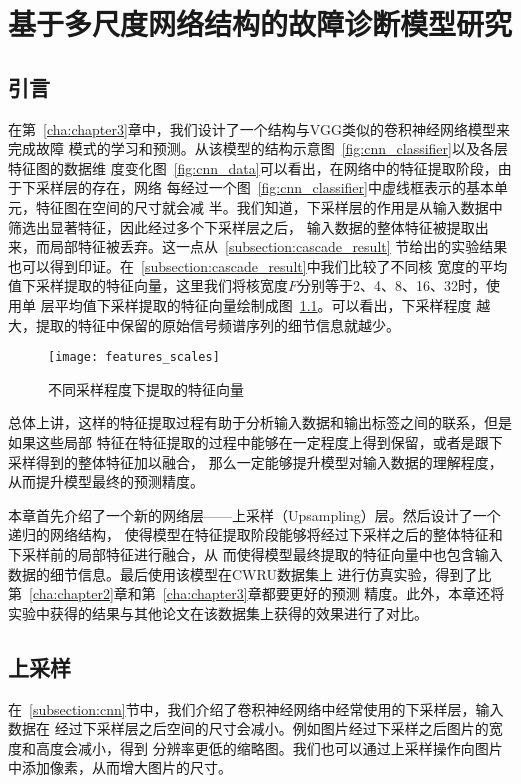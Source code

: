 \chapter{基于多尺度网络结构的故障诊断模型研究}

\section{引言}

在第~\ref{cha:chapter3}章中，我们设计了一个结构与VGG类似的卷积神经网络模型来完成故障
模式的学习和预测。从该模型的结构示意图~\ref{fig:cnn_classifier}以及各层特征图的数据维
度变化图~\ref{fig:cnn_data}可以看出，在网络中的特征提取阶段，由于下采样层的存在，网络
每经过一个图~\ref{fig:cnn_classifier}中虚线框表示的基本单元，特征图在空间的尺寸就会减
半。我们知道，下采样层的作用是从输入数据中筛选出显著特征，因此经过多个下采样层之后，
输入数据的整体特征被提取出来，而局部特征被丢弃。这一点从~\ref{subsection:cascade_result}
节给出的实验结果也可以得到印证。在~\ref{subsection:cascade_result}中我们比较了不同核
宽度的平均值下采样提取的特征向量，这里我们将核宽度$F$分别等于2、4、8、16、32时，使用单
层平均值下采样提取的特征向量绘制成图~\ref{fig:features_scales}。可以看出，下采样程度
越大，提取的特征中保留的原始信号频谱序列的细节信息就越少。
\begin{figure}[ht]
  \centering
  \texttt{[image: features\_scales]}
  \caption{不同采样程度下提取的特征向量}
  \label{fig:features_scales}
\end{figure}

总体上讲，这样的特征提取过程有助于分析输入数据和输出标签之间的联系，但是如果这些局部
特征在特征提取的过程中能够在一定程度上得到保留，或者是跟下采样得到的整体特征加以融合，
那么一定能够提升模型对输入数据的理解程度，从而提升模型最终的预测精度。

本章首先介绍了一个新的网络层——上采样（Upsampling）层。然后设计了一个递归的网络结构，
使得模型在特征提取阶段能够将经过下采样之后的整体特征和下采样前的局部特征进行融合，从
而使得模型最终提取的特征向量中也包含输入数据的细节信息。最后使用该模型在CWRU数据集上
进行仿真实验，得到了比第~\ref{cha:chapter2}章和第~\ref{cha:chapter3}章都要更好的预测
精度。此外，本章还将实验中获得的结果与其他论文在该数据集上获得的效果进行了对比。

\section{上采样}

在~\ref{subsection:cnn}节中，我们介绍了卷积神经网络中经常使用的下采样层，输入数据在
经过下采样层之后空间的尺寸会减小。例如图片经过下采样之后图片的宽度和高度会减小，得到
分辨率更低的缩略图。我们也可以通过上采样操作向图片中添加像素，从而增大图片的尺寸。

